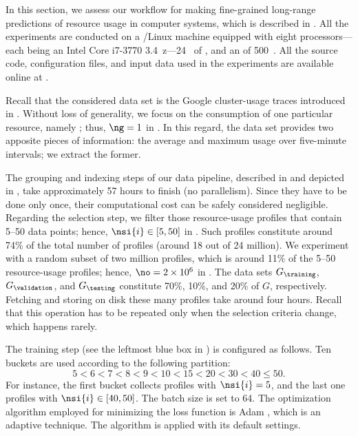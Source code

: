 In this section, we assess our workflow for making fine-grained long-range
predictions of resource usage in computer systems, which is described in
. All the experiments are conducted on a /Linux
machine equipped with eight processors---each being an Intel Core i7-3770
3.4~z---24~ of , and an  of 500~. All the
source code, configuration files, and input data used in the experiments are
available online at \cite{eslab2017b}.


Recall that the considered data set is the Google cluster-usage traces
\cite{reiss2011} introduced in . Without loss of
generality, we focus on the consumption of one particular resource, namely
; thus, $\ng = 1$ in . In this regard, the data set
provides two apposite pieces of information: the average and maximum 
usage over five-minute intervals; we extract the former.

The grouping and indexing steps of our data pipeline, described in
 and depicted in , take
approximately 57 hours to finish (no parallelism). Since they have to be done
only once, their computational cost can be safely considered negligible.
Regarding the selection step, we filter those resource-usage profiles that
contain 5--50 data points; hence, $\nsi{i} \in [5, 50]$ in .
Such profiles constitute around 74\% of the total number of profiles (around 18
out of 24 million). We experiment with a random subset of two million profiles,
which is around 11\% of the 5--50 resource-usage profiles; hence, $\no = 2
\times 10^6$ in . The data sets $G_\training$,
$G_\validation$, and $G_\testing$ constitute 70\%, 10\%, and 20\% of $G$,
respectively. Fetching and storing on disk these many profiles take around four
hours. Recall that this operation has to be repeated only when the selection
criteria change, which happens rarely.


The training step (see the leftmost blue box in ) is
configured as follows. Ten buckets are used according to the following
partition:
\[
  5 < 6 < 7 < 8 < 9 < 10 < 15 < 20 < 30 < 40 \leq 50.
\]
For instance, the first bucket collects profiles with $\nsi{i} = 5$, and the
last one profiles with $\nsi{i} \in [40, 50]$. The batch size \nb is set to 64.
The optimization algorithm employed for minimizing the loss function is Adam
\cite{kingma2014}, which is an adaptive technique. The algorithm is applied with
its default settings.

